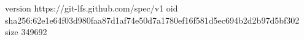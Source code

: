 version https://git-lfs.github.com/spec/v1
oid sha256:62e1e64f03d980faa87d1af74e50d7a1780ef16f581d5ec694b2d2b97d5bf302
size 349692
